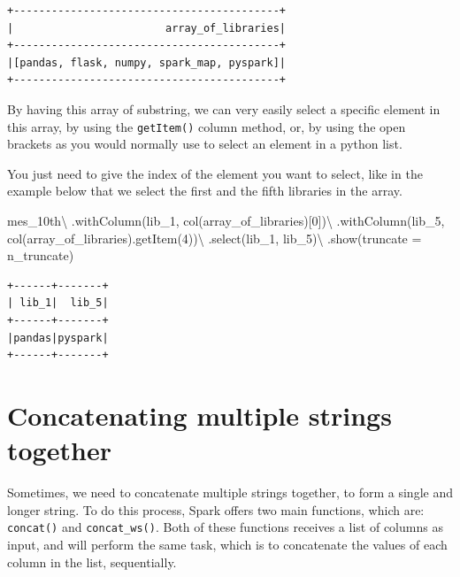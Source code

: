 \documentclass[
  11pt,
  letterpaper,
  DIV=11,
  numbers=noendperiod]{scrreprt}
\newenvironment{Shaded}{\begin{snugshade}}{\end{snugshade}}
\newcommand{\DecValTok}[1]{\textcolor[rgb]{0.68,0.00,0.00}{#1}}
\newcommand{\NormalTok}[1]{\textcolor[rgb]{0.00,0.23,0.31}{#1}}
\newcommand{\OperatorTok}[1]{\textcolor[rgb]{0.37,0.37,0.37}{#1}}
\newcommand{\StringTok}[1]{\textcolor[rgb]{0.13,0.47,0.30}{#1}}
\begin{document}
\begin{verbatim}
+------------------------------------------+
|                        array_of_libraries|
+------------------------------------------+
|[pandas, flask, numpy, spark_map, pyspark]|
+------------------------------------------+
\end{verbatim}

By having this array of substring, we can very easily select a specific
element in this array, by using the \texttt{getItem()} column method,
or, by using the open brackets as you would normally use to select an
element in a python list.

You just need to give the index of the element you want to select, like
in the example below that we select the first and the fifth libraries in
the array.

\begin{Shaded}
\begin{Highlighting}[]
\NormalTok{mes\_10th}\OperatorTok{\textbackslash{}}
\NormalTok{    .withColumn(}\StringTok{\textquotesingle{}lib\_1\textquotesingle{}}\NormalTok{, col(}\StringTok{\textquotesingle{}array\_of\_libraries\textquotesingle{}}\NormalTok{)[}\DecValTok{0}\NormalTok{])}\OperatorTok{\textbackslash{}}
\NormalTok{    .withColumn(}\StringTok{\textquotesingle{}lib\_5\textquotesingle{}}\NormalTok{, col(}\StringTok{\textquotesingle{}array\_of\_libraries\textquotesingle{}}\NormalTok{).getItem(}\DecValTok{4}\NormalTok{))}\OperatorTok{\textbackslash{}}
\NormalTok{    .select(}\StringTok{\textquotesingle{}lib\_1\textquotesingle{}}\NormalTok{, }\StringTok{\textquotesingle{}lib\_5\textquotesingle{}}\NormalTok{)}\OperatorTok{\textbackslash{}}
\NormalTok{    .show(truncate }\OperatorTok{=}\NormalTok{ n\_truncate)}
\end{Highlighting}
\end{Shaded}

\begin{verbatim}
+------+-------+
| lib_1|  lib_5|
+------+-------+
|pandas|pyspark|
+------+-------+
\end{verbatim}

\hypertarget{concatenating-multiple-strings-together}{%
\section{Concatenating multiple strings
together}\label{concatenating-multiple-strings-together}}

Sometimes, we need to concatenate multiple strings together, to form a
single and longer string. To do this process, Spark offers two main
functions, which are: \texttt{concat()} and \texttt{concat\_ws()}. Both
of these functions receives a list of columns as input, and will perform
the same task, which is to concatenate the values of each column in the
list, sequentially.
\end{document}
